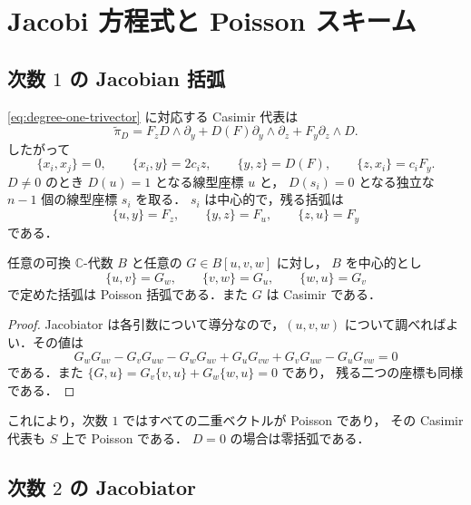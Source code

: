 \section{Jacobi 方程式と Poisson スキーム}
\label{sec:classification}

\subsection{次数 \texorpdfstring{$1$}{1} の Jacobian 括弧}

\eqref{eq:degree-one-trivector} に対応する Casimir 代表は
\begin{equation}
 \widetilde\pi_D
 =F_zD\wedge\partial_y+D(F)\partial_y\wedge\partial_z
 +F_y\partial_z\wedge D.
 \label{eq:degree-one-bivector}
\end{equation}
したがって
\[
 \{x_i,x_j\}=0,\qquad
 \{x_i,y\}=2c_iz,\qquad
 \{y,z\}=D(F),\qquad
 \{z,x_i\}=c_iF_y.
\]
$D\ne0$ のとき $D(u)=1$ となる線型座標 $u$ と，
$D(s_i)=0$ となる独立な $n-1$ 個の線型座標 $s_i$ を取る．
$s_i$ は中心的で，残る括弧は
\[
 \{u,y\}=F_z,\qquad \{y,z\}=F_u,\qquad \{z,u\}=F_y
\]
である．

\begin{lemma}
\label{lemma:jacobian-bracket}
任意の可換 $\mathbb C$-代数 $B$ と任意の $G\in B[u,v,w]$ に対し，
$B$ を中心的とし
\[
 \{u,v\}=G_w,\qquad\{v,w\}=G_u,\qquad\{w,u\}=G_v
\]
で定めた括弧は Poisson 括弧である．また $G$ は Casimir である．
\end{lemma}

\begin{proof}
Jacobiator は各引数について導分なので，$(u,v,w)$ について調べればよい．その値は
\[
 G_wG_{uv}-G_vG_{uw}-G_wG_{uv}+G_uG_{vw}
 +G_vG_{uw}-G_uG_{vw}=0
\]
である．また $\{G,u\}=G_v\{v,u\}+G_w\{w,u\}=0$ であり，
残る二つの座標も同様である．
\end{proof}

これにより，次数 $1$ ではすべての二重ベクトルが Poisson であり，
その Casimir 代表も $S$ 上で Poisson である．
$D=0$ の場合は零括弧である．

\subsection{次数 \texorpdfstring{$2$}{2} の Jacobiator}

